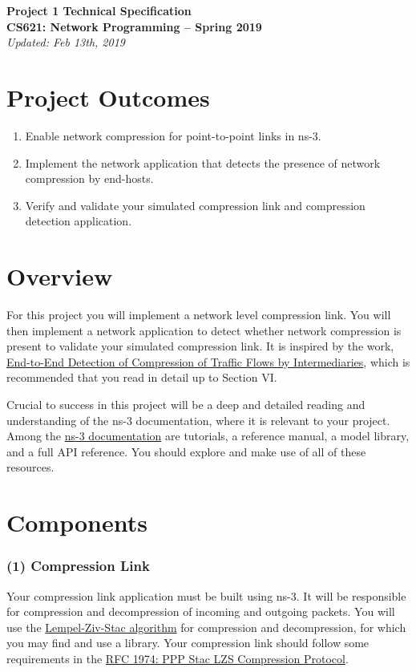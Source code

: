 \documentclass[10pt]{article}
\begin{document}
\Large
{\bf Project 1 Technical Specification}\\
{\bf \noindent CS621: Network Programming -- Spring 2019}\\
\noindent \emph{Updated: Feb 13th, 2019}\\

\normalsize
\setcounter{secnumdepth}{0}
\section{Project Outcomes}
\begin{enumerate}
    \item Enable network compression for point-to-point links in ns-3.
    \item Implement the network application that detects the presence of network compression by end-hosts.
    \item Verify and validate your simulated compression link and compression detection application.
\end{enumerate}

\section{Overview}
For this project you will implement a network level compression link. You will then implement a network application to detect whether network compression is present to validate your simulated compression link. It is inspired by the work, \href{https://lasr.cs.ucla.edu/vahab/resources/compression_detection.pdf}{End-to-End Detection of Compression of Traffic Flows by Intermediaries}, which is recommended that you read in detail up to Section VI.

Crucial to success in this project will be a deep and detailed reading and understanding of the ns-3 documentation, where it is relevant to your project. Among the \href{https://www.nsnam.org/releases/ns-3-29/documentation/}{ns-3 documentation} are tutorials, a reference manual, a model library, and a full API reference.  You should explore and make use of all of these resources.

\section{Components}
\subsubsection{(1) Compression Link}
Your compression link application must be built using ns-3. It will be responsible for compression and decompression of incoming and outgoing packets. You will use the \href{https://en.wikipedia.org/wiki/Lempel\%E2\%80\%93Ziv\%E2\%80\%93Stac}{Lempel-Ziv-Stac algorithm} for compression and decompression, for which you may find and use a library.  Your compression link should follow some requirements in the \href{http://www.rfcreader.com/#rfc1974}{RFC 1974: PPP Stac LZS Compression Protocol}.
\end{document}
